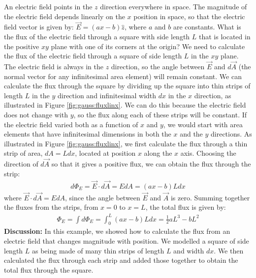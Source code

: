 \begin{example}{An electric field points in the $z$ direction everywhere in space. The magnitude of the electric field depends linearly on the $x$ position in space, so that the electric field vector is given by: $\vec E=(ax-b)\hat z$, where $a$ and $b$ are constants. What is the flux of the electric field through a square with side length $L$ that is located in the positive $xy$ plane with one of its corners at the origin?}
We need to calculate the flux of the electric field through a square of side length $L$ in the $xy$ plane. The electric field is always in the $z$ direction, so the angle between $\vec E$ and $d\vec A$ (the normal vector for any infinitesimal area element) will remain constant. We can calculate the flux through the square by dividing up the square into thin strips of length $L$ in the $y$ direction and infinitesimal width $dx$ in the $x$ direction, as illustrated in Figure \ref{fig:gauss:fluxlinx}. We can do this because the electric field does not change with $y$, so the flux along each of these strips will be constant. If the electric field varied both as a function of $x$ and $y$, we would start with area elements that have infinitesimal dimensions in both the $x$ and the $y$ directions. 
As illustrated in Figure \ref{fig:gauss:fluxlinx}, we first calculate the flux through a thin strip of area, $dA=Ldx$, located at position $x$ along the $x$ axis. Choosing the direction of $d\vec A$ so that it gives a positive flux, we can obtain the flux through the strip:
\begin{align*}
d\Phi_E=\vec E\cdot d\vec A=EdA=(ax-b)Ldx
\end{align*}
where $\vec E\cdot d\vec A=EdA$, since the angle between $\vec E$ and $\vec A$ is zero. Summing together the fluxes from the strips, from $x=0$ to $x=L$, the total flux is given by:
\begin{align*}
\Phi_E=\int d\Phi_E=\int_0^L(ax-b)Ldx=\frac{1}{2}aL^3-bL^2
\end{align*}
\textbf{Discussion:} In this example, we showed how to calculate the flux from an electric field that changes magnitude with position. We modelled a square of side length $L$ as being made of many thin strips of length $L$ and width $dx$. We then calculated the flux through each strip and added those together to obtain the total flux through the square.
\end{example}
